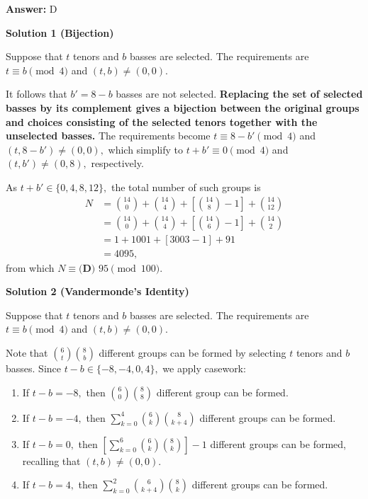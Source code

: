 \begin{enumerate}
 \textbf{Answer: }D



\textbf{Solution 1 (Bijection)}

Suppose that $t$ tenors and $b$ basses are selected. The requirements are $t\equiv b\pmod{4}$ and $(t,b)\neq(0,0).$

 It follows that $b'=8-b$ basses are not selected. \textbf{Replacing the set of selected basses by its complement gives a bijection between the original groups and choices consisting of the selected tenors together with the unselected basses.} The requirements become $t\equiv8-b'\pmod{4}$ and $(t,8-b')\neq(0,0),$ which simplify to $t+b'\equiv0\pmod{4}$ and $(t,b')\neq(0,8),$ respectively.

 As $t+b'\in\{0,4,8,12\},$ the total number of such groups is
 \begin{align*} N&=\binom{14}{0}+\binom{14}{4}+\left[\binom{14}{8}-1\right]+\binom{14}{12} \\ &=\binom{14}{0}+\binom{14}{4}+\left[\binom{14}{6}-1\right]+\binom{14}{2} \\ &=1+1001+[3003-1]+91 \\ &=4095, \end{align*}
from which $N\equiv\boxed{\textbf{(D) } 95}\pmod{100}.$




\textbf{Solution 2 (Vandermonde's Identity)}

Suppose that $t$ tenors and $b$ basses are selected. The requirements are $t\equiv b\pmod{4}$ and $(t,b)\neq(0,0).$

 Note that $\binom{6}{t}\binom{8}{b}$ different groups can be formed by selecting $t$ tenors and $b$ basses. Since $t-b\in\{-8,-4,0,4\},$ we apply casework:

 
            \begin{enumerate} 
        \item If $t-b=-8,$ then $\binom{6}{0}\binom{8}{8}$ different group can be formed.

        \item If $t-b=-4,$ then $\sum_{k=0}^{4}\binom{6}{k}\binom{8}{k+4}$ different groups can be formed.

        \item If $t-b=0,$ then $\left[\sum_{k=0}^{6}\binom{6}{k}\binom{8}{k}\right]-1$ different groups can be formed, recalling that $(t,b)\neq(0,0).$

        \item If $t-b=4,$ then $\sum_{k=0}^{2}\binom{6}{k+4}\binom{8}{k}$ different groups can be formed.


\end{enumerate}
\end{enumerate}

